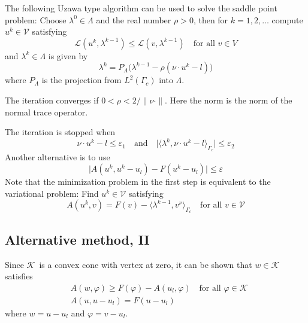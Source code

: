 \documentclass[12pt,a4paper]{article}
\numberwithin{equation}{section}
\numberwithin{table}{section}
\numberwithin{figure}{section}
\newcommand{\V}{\ensuremath{\mathcal{V}}}
\newcommand{\K}{\ensuremath{\mathcal{K}}}
\newcommand{\Lagrange}{\ensuremath{\mathcal L}}
\renewcommand{\epsilon}{\varepsilon}
\renewcommand{\phi}{\varphi}
\providecommand{\abs}[1]{\lvert #1 \rvert}
\providecommand{\norm}[1]{\lVert #1 \rVert}
\providecommand{\dualp}[2]{\langle #1, #2 \rangle}
\renewcommand{\forall}{\text{for all }}
\newcommand{\qforall}{\quad\text{for all }}
\begin{document}
The following Uzawa type algorithm can be used to solve the saddle point problem: Choose
$\lambda^0 \in \Lambda$ and the real number $\rho > 0$, then for $k=1,2,\ldots$ compute
$u^k\in\V$ satisfying
\begin{equation}
  \Lagrange(u^k, \lambda^{k-1}) \le \Lagrange(v, \lambda^{k-1})
  \qforall v \in V
\end{equation}
and $\lambda^k\in \Lambda$ is given by
\begin{equation}
  \lambda^k = P_\Lambda \bigl(\lambda^{k-1} - \rho (\nu\cdot u^k - l) \bigr)
\end{equation}
where $P_\Lambda$ is the projection from $L^2(\Gamma_c)$ into $\Lambda$.

The iteration converges if $0 < \rho < 2/\norm{\nu\cdot}$. Here the
norm is the norm of the normal trace operator.

The iteration is stopped when
\begin{equation}
  \nu\cdot u^k -l \le \epsilon_1 \quad\text{and}\quad
  \abs{\dualp{\lambda^k}{\nu\cdot u^k -l}_{\Gamma_c}} \le \epsilon_2 
\end{equation}
Another alternative is to use
\begin{equation}
  \abs{A(u^k, u^k-u_l) - F(u^k - u_l)} \le \epsilon
\end{equation}
Note that the minimization problem in the first step is equivalent to the variational
problem: Find $u^k\in \V$ satisfying
\begin{equation}
  A(u^k, v) = F(v) - \dualp{\lambda^{k-1}}{v^\nu}_{\Gamma_c}
  \qforall v\in \V
\end{equation}
\subsection{Alternative method, II}

Since \K\ is a convex cone with vertex at zero, it can be shown that $w\in \K$
satisfies
\begin{align}
  &A(w,\phi) \ge F(\phi) - A(u_l,\phi) \quad\forall{\phi\in \K} \\
  &A(u,u-u_l)  = F(u-u_l)
\end{align}
where $w=u-u_l$ and $\phi=v-u_l$.
\end{document}
